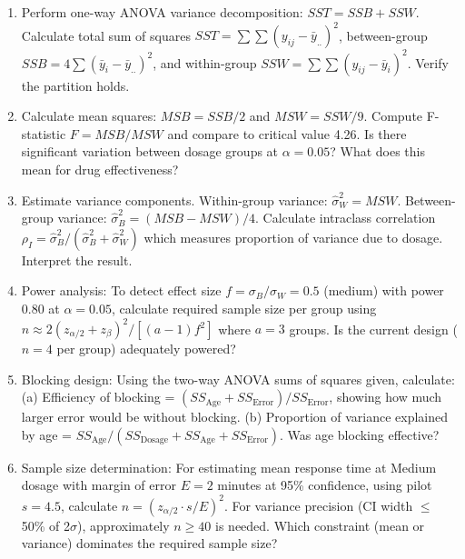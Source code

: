 \documentclass[12pt]{article}
\begin{document}
\begin{enumerate}[label=(\alph*)]
\item Perform one-way ANOVA variance decomposition: $SST = SSB + SSW$. Calculate total sum of squares $SST = \sum\sum(y_{ij} - \bar{y}_{..})^2$, between-group $SSB = 4\sum(\bar{y}_i - \bar{y}_{..})^2$, and within-group $SSW = \sum\sum(y_{ij} - \bar{y}_i)^2$. Verify the partition holds.

\item Calculate mean squares: $MSB = SSB/2$ and $MSW = SSW/9$. Compute F-statistic $F = MSB/MSW$ and compare to critical value 4.26. Is there significant variation between dosage groups at $\alpha = 0.05$? What does this mean for drug effectiveness?

\item Estimate variance components. Within-group variance: $\hat{\sigma}_W^2 = MSW$. Between-group variance: $\hat{\sigma}_B^2 = (MSB - MSW)/4$. Calculate intraclass correlation $\rho_I = \hat{\sigma}_B^2/(\hat{\sigma}_B^2 + \hat{\sigma}_W^2)$ which measures proportion of variance due to dosage. Interpret the result.

\item Power analysis: To detect effect size $f = \sigma_B/\sigma_W = 0.5$ (medium) with power 0.80 at $\alpha = 0.05$, calculate required sample size per group using $n \approx 2(z_{\alpha/2} + z_\beta)^2/[(a-1)f^2]$ where $a=3$ groups. Is the current design ($n=4$ per group) adequately powered?

\item Blocking design: Using the two-way ANOVA sums of squares given, calculate: (a) Efficiency of blocking = $(SS_{\text{Age}} + SS_{\text{Error}})/SS_{\text{Error}}$, showing how much larger error would be without blocking. (b) Proportion of variance explained by age = $SS_{\text{Age}}/(SS_{\text{Dosage}} + SS_{\text{Age}} + SS_{\text{Error}})$. Was age blocking effective?

\item Sample size determination: For estimating mean response time at Medium dosage with margin of error $E = 2$ minutes at 95\% confidence, using pilot $s = 4.5$, calculate $n = (z_{\alpha/2} \cdot s / E)^2$. For variance precision (CI width $\leq$ 50\% of 2$\sigma$), approximately $n \geq 40$ is needed. Which constraint (mean or variance) dominates the required sample size?
\end{enumerate}
\end{document}
